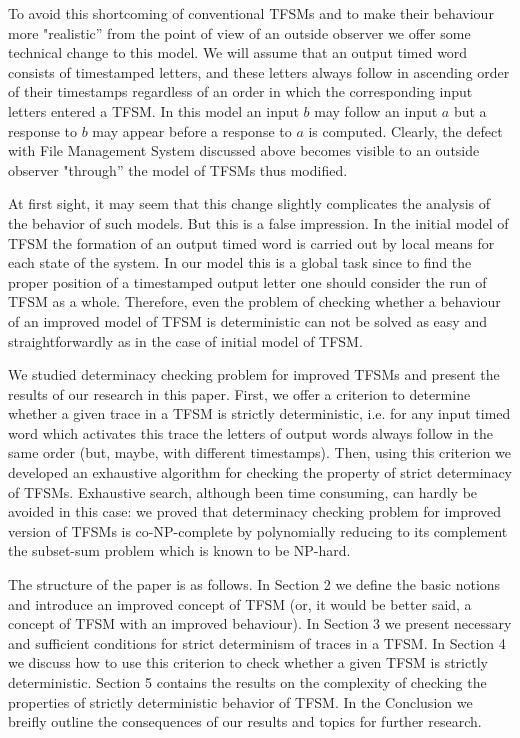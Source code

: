 \documentclass[conference]{IEEEtran}
\begin{document}
To avoid this shortcoming of conventional TFSMs and to make their behaviour more "realistic'' from the point of view of an outside observer we offer some technical change to this model. We will assume that an output timed word consists of timestamped letters, and these letters always follow in ascending order of their timestamps regardless of an order in which the corresponding input letters entered a TFSM. In this model an input $b$ may follow an input $a$ but a response to $b$ may appear before a response to $a$ is computed. Clearly, the defect with File Management System discussed above becomes visible to an outside observer "through'' the model of TFSMs thus modified. 

At first sight, it may seem that this change slightly complicates the analysis of the behavior of such models. But this is a false impression. In the initial model of TFSM the formation of an output timed word is carried out by local means for each state of the system. In our model this is a global task since to find the proper position of a timestamped output letter one should consider the run of TFSM as a whole. Therefore, even the problem of checking whether a behaviour of an improved model of TFSM is deterministic can not be solved as easy and straightforwardly as in the case of initial model of TFSM. 

We studied determinacy checking problem for improved TFSMs and present the results of our research in this paper. First, we offer a criterion to determine whether a given trace in a TFSM is strictly deterministic, i.e. for any input timed word which activates this trace the letters of output words always follow in the same order (but, maybe, with different timestamps). Then, using this criterion we developed an exhaustive algorithm for checking the property of strict determinacy of TFSMs. Exhaustive search, although been time consuming, can hardly be avoided in this case: we proved that determinacy checking problem for improved version of TFSMs is co-NP-complete by polynomially reducing to its complement the subset-sum problem \cite{ssp} which is known to be NP-hard.

The structure of the paper is as follows. In Section 2 we define the basic notions and introduce an improved concept of TFSM (or, it would be better said, a concept of TFSM with an improved behaviour). In Section 3 we present necessary and sufficient conditions for strict determinism of traces in a TFSM. In Section 4 we discuss how to use this criterion to check whether a given TFSM is strictly deterministic. Section 5 contains the results on the complexity of checking the properties of strictly deterministic behavior of TFSM. In the Conclusion we breifly outline the consequences of our results and topics for further research.
\end{document}
